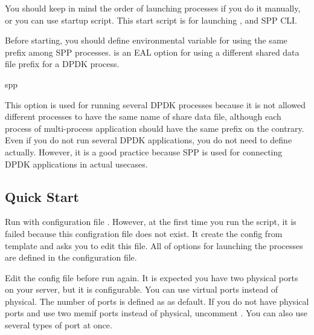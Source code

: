 \documentclass[a4paper,11pt,openany,oneside,english]{sphinxmanual}
\begin{document}
You should keep in mind the order of launching processes if you do it
manually, or you can use startup script. This start script is for launching
,  and SPP CLI.

Before starting, you should define environmental variable 
for using the same prefix among SPP processes.  is an EAL
option for using a different shared data file prefix for a DPDK process.

\begin{sphinxVerbatim}[commandchars=\\\{\},formatcom=\footnotesize]
  spp
\end{sphinxVerbatim}

This option is used for running several DPDK processes because it is not
allowed different processes to have the same name of share data file, although
each process of multi-process application should have the same prefix on the
contrary.
Even if you do not run several DPDK applications, you do not need to define
actually. However, it is a good practice because SPP is used for connecting
DPDK applications in actual usecases.


\subsection{Quick Start}
\label{\detokenize{gsg/howto_use:quick-start}}\label{\detokenize{gsg/howto_use:spp-gsg-howto-quick-start}}
Run  with configuration file . However,
at the first time you run the script, it is failed because this configration
file does not exist. It create the config from template
 and asks you to edit this file.
All of options for launching the processes are defined in the configuration
file.

Edit the config file before run  again. It is expected you
have two physical ports on your server, but it is configurable.
You can use virtual ports instead of physical.
The number of ports is defined as  as default.
If you do not have physical ports and use two memif ports instead of physical,
uncomment .
You can also use several types of port at once.
\end{document}
